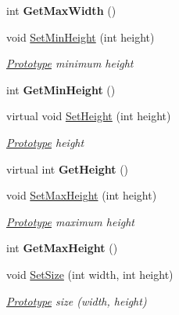 \begin{DoxyCompactItemize}
\mbox{\label{class_space_v_i_l_1_1_prototype_abf5bdd0bdf98b0232eae65f1b34a2ac8}} 
int {\bfseries Get\+Max\+Width} ()
\item 
void \mbox{\hyperlink{class_space_v_i_l_1_1_prototype_ab615ad8a0985630fa96cf13d7484a4bc}{Set\+Min\+Height}} (int height)
\begin{DoxyCompactList}\small\item\em \mbox{\hyperlink{class_space_v_i_l_1_1_prototype}{Prototype}} minimum height \end{DoxyCompactList}\item 
\mbox{\label{class_space_v_i_l_1_1_prototype_ab755c8b94d71a61794208f1b3ac37b41}} 
int {\bfseries Get\+Min\+Height} ()
\item 
virtual void \mbox{\hyperlink{class_space_v_i_l_1_1_prototype_adc0adcbd1c3800d9525798ba7be5832a}{Set\+Height}} (int height)
\begin{DoxyCompactList}\small\item\em \mbox{\hyperlink{class_space_v_i_l_1_1_prototype}{Prototype}} height \end{DoxyCompactList}\item 
\mbox{\label{class_space_v_i_l_1_1_prototype_a2bd80c817b8a1708ab8f797dbebb3839}} 
virtual int {\bfseries Get\+Height} ()
\item 
void \mbox{\hyperlink{class_space_v_i_l_1_1_prototype_ae36a8ab0a4dff36218f56ae4cc9d39d4}{Set\+Max\+Height}} (int height)
\begin{DoxyCompactList}\small\item\em \mbox{\hyperlink{class_space_v_i_l_1_1_prototype}{Prototype}} maximum height \end{DoxyCompactList}\item 
\mbox{\label{class_space_v_i_l_1_1_prototype_aa8c79f15b51050a4dc941c9005530902}} 
int {\bfseries Get\+Max\+Height} ()
\item 
void \mbox{\hyperlink{class_space_v_i_l_1_1_prototype_a2f7301e72422245f5d0a72422cd48deb}{Set\+Size}} (int width, int height)
\begin{DoxyCompactList}\small\item\em \mbox{\hyperlink{class_space_v_i_l_1_1_prototype}{Prototype}} size (width, height) \end{DoxyCompactList}\item 

\end{DoxyCompactItemize}
